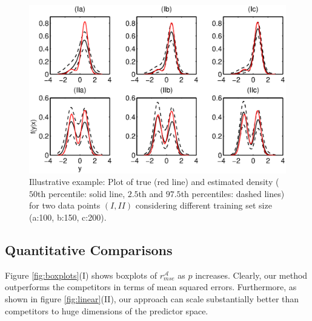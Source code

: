\documentclass{article} %
\providecommand{\mc}[1]{\mathcal{#1}}
\begin{document}
\begin{figure}[h!]
\centering
 \vskip -10pt 
\includegraphics[width=120mm]{../figs/ch3_density.eps}
 \vskip -15pt 
\caption{Illustrative example: Plot of true (red line) and estimated density ($50$th percentile: solid line, $2.5$th and $97.5$th percentiles: dashed lines) for two data points $(I, II)$ considering different training set size (a:100, b:150, c:200). } \label{plotDensity}
\end{figure}




\subsection{Quantitative Comparisons} 


Figure \ref{fig:boxplots}(I) shows boxplots of $r_{mse}^{\mc{A}}$ as $p$ increases. Clearly, our method outperforms the competitors in terms of mean squared errors. Furthermore, as shown in figure \ref{fig:linear}(II), our approach can scale substantially better than competitors to huge dimensions of the predictor space. 
\end{document}
